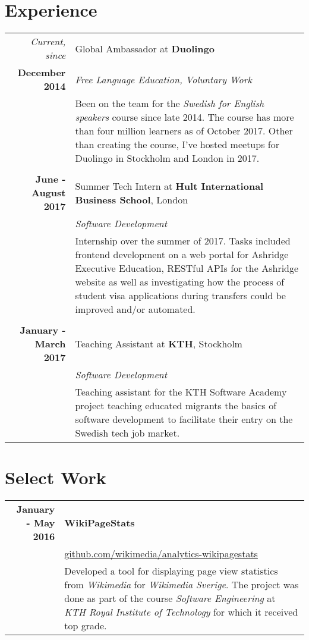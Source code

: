 \documentclass[a4paper,10pt]{article}
\begin{document}
\section{Experience}
\begin{tabular}{r|p{11cm}}
\emph{Current, since} & Global Ambassador at \textbf{Duolingo}\\\textbf{December 2014}&\emph{Free Language Education, Voluntary Work}\\&\footnotesize{Been on the team for the \emph{Swedish for English speakers} course since late 2014. The course has more than four million learners as of October 2017. Other than creating the course, I've hosted meetups for Duolingo in Stockholm and London in 2017.}\\ \\

\textbf{June - August 2017} & Summer Tech Intern at \textbf{Hult International Business School}, London \\
& \emph{Software Development} \\
& \footnotesize{Internship over the summer of 2017. Tasks included frontend development on a web portal for Ashridge Executive Education, RESTful APIs for the Ashridge website as well as investigating how the process of student visa applications during transfers could be improved and/or automated.} \\ \\

\textbf{January - March 2017} & Teaching Assistant at \textbf{KTH}, Stockholm \\
& \emph{Software Development} \\
& \footnotesize{Teaching assistant for the KTH Software Academy project teaching educated migrants the basics of software development to facilitate their entry on the Swedish tech job market.} \\
\end{tabular}

\section{Select Work}
\begin{tabular}{r|p{11cm}}
\textbf{January - May 2016} & \textbf{WikiPageStats} \\
& \href{https://github.com/wikimedia/analytics-wikipagestats}{github.com/wikimedia/analytics-wikipagestats} \\
& \footnotesize{Developed a tool for displaying page view statistics from \emph{Wikimedia} for \emph{Wikimedia Sverige}. The project was done as part of the course \emph{Software Engineering} at \emph{KTH Royal Institute of Technology} for which it received top grade.}
\end{tabular}
\end{document}
